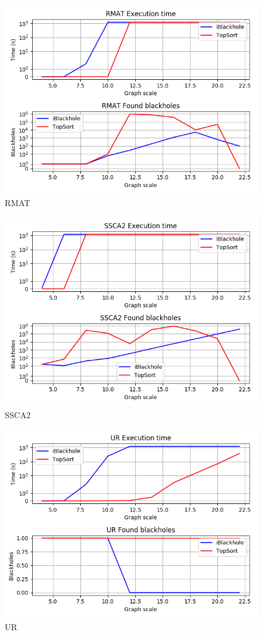 \documentclass{svproc}
\begin{document}
%
%



\begin{figure}[p]
    \includegraphics[width=\linewidth]{rmat.png}
    \caption{RMAT}
    \label{fig:rmat}
\end{figure}
\begin{figure}[p]
    \includegraphics[width=\linewidth]{ssca2.png}
    \caption{SSCA2}
    \label{fig:rmat}
\end{figure}
\begin{figure}[p]
    \includegraphics[width=\linewidth]{ur.png}
    \caption{UR}
    \label{fig:rmat}
\end{figure}
\end{document}

